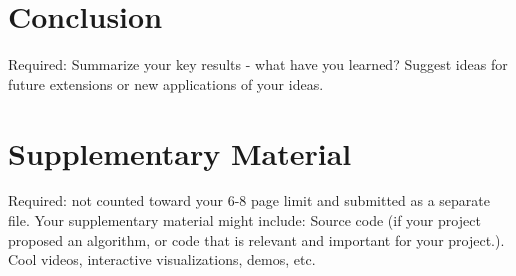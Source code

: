 \documentclass[10pt,twocolumn,letterpaper]{article}
\begin{document}
\section{Conclusion}
Required: Summarize your key results - what have you learned? 
Suggest ideas for future extensions or new applications of your ideas.

\section{Supplementary Material}
Required: not counted toward your 6-8 page limit and submitted as a separate file. Your supplementary material might include:
Source code (if your project proposed an algorithm, or code that is relevant and important for your project.).
Cool videos, interactive visualizations, demos, etc.

{
    \small
    
    
}
\end{document}
